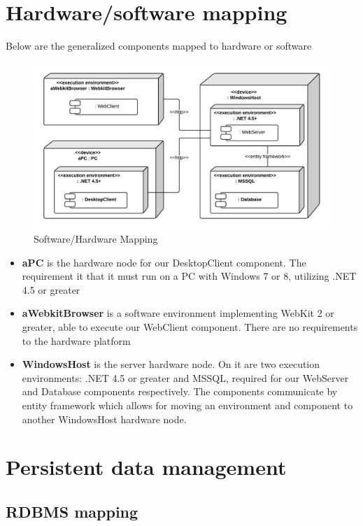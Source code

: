 \section{Hardware/software mapping}
\label{sec:Hardware/software mapping}
Below are the generalized components mapped to hardware or software
\begin{figure}[H]
\includegraphics[scale=0.2]{img/SoftwareHardwareMapping.png}
\caption{Software/Hardware Mapping}
\label{fig:SoftwareHardwareMapping}
\end{figure}

\begin{itemize}
\item \textbf{aPC} is the hardware node for our DesktopClient component. The requirement it that it must run on a PC with Windows 7 or 8, utilizing .NET 4.5 or greater
\item \textbf{aWebkitBrowser} is a software environment implementing WebKit 2 or greater, able to execute our WebClient component. There are no requirements to the hardware platform
\item \textbf{WindowsHost} is the server hardware node. On it are two execution environments: .NET 4.5 or greater and MSSQL, required for our WebServer and Database components respectively. The components communicate by entity framework which allows for moving an environment and component to another WindowsHost hardware node.
\end{itemize}

\section{Persistent data management}

\subsection{RDBMS mapping}

